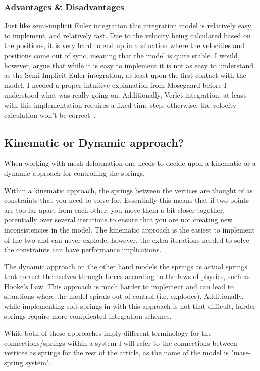 \subsubsection{Advantages \& Disadvantages}
Just like semi-implicit Euler integration this integration model is relatively easy to implement, and relatively fast.
Due to the velocity being calculated based on the positions, it is very hard to end up in a situation where the velocities and positions come out of sync,
meaning that the model is quite stable.
I would, however, argue that while it is easy to implement it is not as easy to understand as the Semi-Implicit Euler integration, at least upon the first contact with the model.
I needed a proper intuitive explanation from Mosegaard\cite{mosegaards_clothing_simulation} before I understood what was really going on.
Additionally, Verlet integration, at least with this implementation requires a fixed time step, otherwise, the velocity calculation won't be correct~\cite{alan_wake_mass_spring}.

\subsection{Kinematic or Dynamic approach?}
When working with mesh deformation one needs to decide upon a kinematic or a dynamic approach for controlling the springs.

Within a kinematic approach, the springs between the vertices are thought of as constraints that you need to solve for.
Essentially this means that if two points are too far apart from each other, you move them a bit closer together, potentially over several iterations to ensure that you are not creating
new inconsistencies in the model.
The kinematic approach is the easiest to implement of the two and can never explode, however, the extra iterations needed to solve the constraints can have performance implications.

The dynamic approach on the other hand models the springs as actual springs that correct themselves through forces according to the laws of physics, such as Hooke's Law.
This approach is much harder to implement and can lead to situations where the model spirals out of control (i.e. explodes).
Additionally, while implementing soft springs in with this approach is not that difficult, harder springs require more complicated integration schemes\cite{math_for_games}.

While both of these approaches imply different terminology for the connections/springs within a system I will refer to the connections between vertices as springs for the rest of the article, as the name of the model is "mass-spring system".

